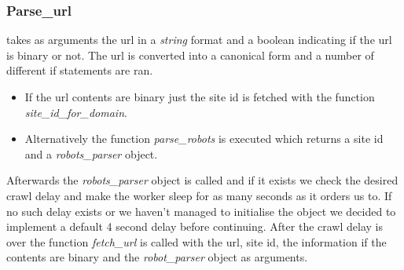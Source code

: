 \documentclass[runningheads]{llncs}
\begin{document}
\subsubsection{Parse\_url}
takes as arguments the url in a \textit{string} format and a boolean indicating if the url is binary or not. The url is converted into a canonical form and a number of different if statements are ran.
\begin{itemize}
\item If the url contents are binary just the site id is fetched with the function \textit{site\_id\_for\_domain}.
\item Alternatively the function \textit{parse\_robots} is executed which returns a site id and a \textit{robots\_parser} object.
\end{itemize}
Afterwards the \textit{robots\_parser} object is called and if it exists we check the desired crawl delay and make the worker sleep for as many seconds as it orders us to. If no such delay exists or we haven't managed to initialise the object we decided to implement a default 4 second delay before continuing. After the crawl delay is over the function \textit{fetch\_url} is called with the url, site id, the information if the contents are binary and the \textit{robot\_parser} object as arguments.
\end{document}
